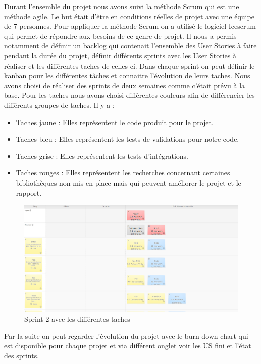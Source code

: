 \documentclass [a4paper,11pt]{article}
\begin{document}
Durant l'ensemble du projet nous avons suivi la méthode Scrum qui est une méthode agile. Le but était d'être en conditions réelles de projet avec une équipe de 7 personnes. Pour appliquer la méthode Scrum on a utilisé le logiciel Icescrum qui permet de répondre aux besoins de ce genre de projet. Il nous a permis notamment de définir un backlog qui contenait l'ensemble des User Stories à faire pendant la durée du projet, définir différents sprints avec les User Stories à réaliser et les différentes taches de celles-ci. Dans chaque sprint on peut définir le kanban pour les différentes tâches et connaitre l'évolution de leurs taches. Nous avons choisi de réaliser des sprints de deux semaines comme c'était prévu à la base. 
Pour les taches nous avons choisi différentes couleurs afin de différencier les différents groupes de taches. Il y a :
\begin{itemize}
\item Taches jaune : Elles représentent le code produit pour le projet.
\item Taches bleu : Elles représentent les tests de validations pour notre code.
\item Taches grise : Elles représentent les tests d'intégrations.
\item Taches rouges : Elles représentent les recherches concernant certaines bibliothèques non mis en place mais qui peuvent améliorer le projet et le rapport.
\end{itemize}

\begin{figure}[!h]
\centering
\includegraphics[scale=0.3]{img/icescrum.png}
\caption[Scrum]{ Sprint 2 avec les différentes taches }
\end{figure}

Par la suite on peut regarder l'évolution du projet avec le burn down chart qui est disponible pour chaque projet et via différent onglet voir les US fini et l'état des sprints.
\end{document}
